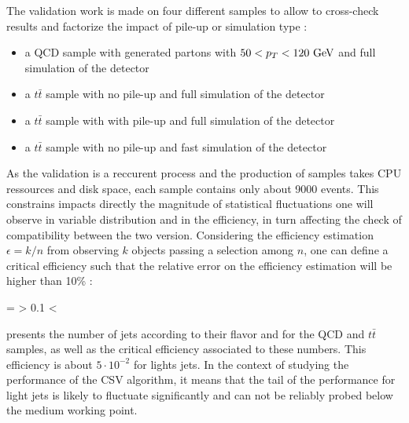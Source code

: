     The validation work is made on four different samples to allow to cross-check results
    and factorize the impact of pile-up or simulation type :
    \begin{itemize}
        \item a QCD sample with generated partons with $50 < p_T < 120~\text{GeV}$ and full simulation
        of the detector
        \item a $t\bar{t}$ sample with no pile-up and full simulation of the detector
        \item a $t\bar{t}$ sample with with pile-up and full simulation of the detector
        \item a $t\bar{t}$ sample with no pile-up and fast simulation of the detector
    \end{itemize}

    As the validation is a reccurent process and the production of samples takes CPU
    ressources and disk space, each sample contains only about 9000 events. This constrains
    impacts directly the magnitude of statistical fluctuations one will observe in
    variable distribution and in the efficiency, in turn affecting the check of compatibility
    between the two version. Considering the efficiency estimation $\epsilon = k/n$ from
    observing $k$ objects passing a selection among $n$, one can define a critical efficiency
    such that the relative error on the efficiency estimation will be higher than 10\% :

    {
        \frac{\sigma_\epsilon}{\epsilon} =  > 0.1
        \hspace*{1cm}
        \Rightarrow
        \hspace*{1cm}
        \epsilon < 
    }

     presents the number of jets according to their flavor
    and for the QCD and $t\bar{t}$ samples, as well as the critical efficiency associated
    to these numbers. This efficiency is about $5\cdot10^{-2}$ for lights jets. In the context
    of studying the performance of the CSV algorithm, it means that the tail of the performance
    for light jets is likely to fluctuate significantly and can not be reliably probed below
    the medium working point.

